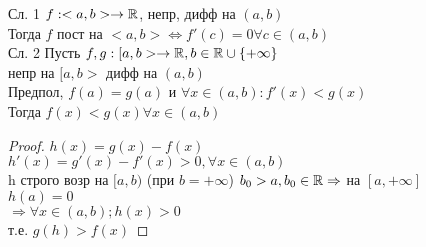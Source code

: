 Сл. 1 $ f : <a, b> \rightarrow \mathbb{R} $, непр, дифф на $(a,b) $\\
Тогда $ f $ пост на $ <a,b> \Leftrightarrow f'(c) = 0 \forall c \in (a,b) $ \\
Сл. 2 Пусть $ f, g : [a, b> \rightarrow \mathbb{R}, b \in \mathbb{R} \cup \{+\infty \} $\\
непр на $ [a, b> $ дифф на $ (a,b)$\\
Предпол, $ f(a) = g(a) $ и $ \forall x \in (a,b) : f'(x) < g(x) $ \\
Тогда $ f(x) < g(x) \forall x \in (a,b) $ \\
\begin{proof}
	$ h(x) = g(x) - f(x) $ \\
	$ h'(x) = g'(x) - f'(x) > 0, \forall x \in (a,b) $\\
	h строго возр на $ [a, b) $ (при $b = +\infty $) $ b_0 > a, b_0 \in \mathbb{R} \Rightarrow $ на $ [a, +\infty] $ \\
	$ h(a) = 0 $ \\
	$ \Rightarrow \forall x \in (a,b) ; h(x) > 0 $ \\
	т.е. $ g(h) > f(x) $ 
\end{proof}  


